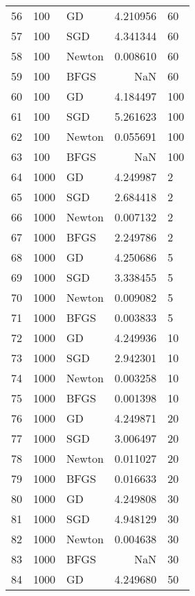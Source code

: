 \begin{tabular}{lllrl}
56  &      100 &      GD &    4.210956 &     60 \\
57  &      100 &     SGD &    4.341344 &     60 \\
58  &      100 &  Newton &    0.008610 &     60 \\
59  &      100 &    BFGS &         NaN &     60 \\
60  &      100 &      GD &    4.184497 &    100 \\
61  &      100 &     SGD &    5.261623 &    100 \\
62  &      100 &  Newton &    0.055691 &    100 \\
63  &      100 &    BFGS &         NaN &    100 \\
64  &     1000 &      GD &    4.249987 &      2 \\
65  &     1000 &     SGD &    2.684418 &      2 \\
66  &     1000 &  Newton &    0.007132 &      2 \\
67  &     1000 &    BFGS &    2.249786 &      2 \\
68  &     1000 &      GD &    4.250686 &      5 \\
69  &     1000 &     SGD &    3.338455 &      5 \\
70  &     1000 &  Newton &    0.009082 &      5 \\
71  &     1000 &    BFGS &    0.003833 &      5 \\
72  &     1000 &      GD &    4.249936 &     10 \\
73  &     1000 &     SGD &    2.942301 &     10 \\
74  &     1000 &  Newton &    0.003258 &     10 \\
75  &     1000 &    BFGS &    0.001398 &     10 \\
76  &     1000 &      GD &    4.249871 &     20 \\
77  &     1000 &     SGD &    3.006497 &     20 \\
78  &     1000 &  Newton &    0.011027 &     20 \\
79  &     1000 &    BFGS &    0.016633 &     20 \\
80  &     1000 &      GD &    4.249808 &     30 \\
81  &     1000 &     SGD &    4.948129 &     30 \\
82  &     1000 &  Newton &    0.004638 &     30 \\
83  &     1000 &    BFGS &         NaN &     30 \\
84  &     1000 &      GD &    4.249680 &     50 \\

\end{tabular}
